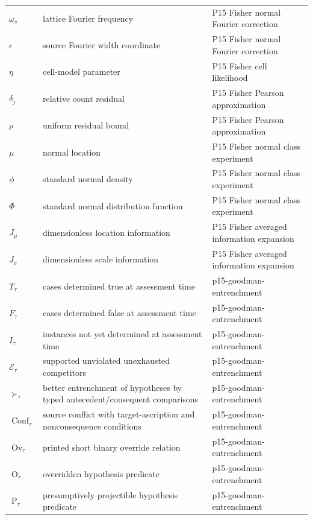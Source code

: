 \begin{longtable}{@{}p{}p{}p{}@{}}
\(\omega_s\) & lattice Fourier frequency & P15 Fisher normal Fourier correction \\
\(\epsilon\) & source Fourier width coordinate & P15 Fisher normal Fourier correction \\
\(\eta\) & cell-model parameter & P15 Fisher cell likelihood \\
\(\delta_j\) & relative count residual & P15 Fisher Pearson approximation \\
\(\rho\) & uniform residual bound & P15 Fisher Pearson approximation \\
\(\mu\) & normal location & P15 Fisher normal class experiment \\
\(\phi\) & standard normal density & P15 Fisher normal class experiment \\
\(\Phi\) & standard normal distribution function & P15 Fisher normal class experiment \\
\(J_\mu\) & dimensionless location information & P15 Fisher averaged information expansion \\
\(J_\sigma\) & dimensionless scale information & P15 Fisher averaged information expansion \\
\(T_\tau\) & cases determined true at assessment time & p15-\allowbreak{}goodman-\allowbreak{}entrenchment \\
\(F_\tau\) & cases determined false at assessment time & p15-\allowbreak{}goodman-\allowbreak{}entrenchment \\
\(I_\tau\) & instances not yet determined at assessment time & p15-\allowbreak{}goodman-\allowbreak{}entrenchment \\
\(\mathcal E_\tau\) & supported unviolated unexhausted competitors & p15-\allowbreak{}goodman-\allowbreak{}entrenchment \\
\(\succ_\tau\) & better entrenchment of hypotheses by typed antecedent/consequent comparisons & p15-\allowbreak{}goodman-\allowbreak{}entrenchment \\
\(\operatorname{Conf}_\tau\) & source conflict with target-ascription and nonconsequence conditions & p15-\allowbreak{}goodman-\allowbreak{}entrenchment \\
\(\operatorname{Ov}_\tau\) & printed short binary override relation & p15-\allowbreak{}goodman-\allowbreak{}entrenchment \\
\(\operatorname{O}_\tau\) & overridden hypothesis predicate & p15-\allowbreak{}goodman-\allowbreak{}entrenchment \\
\(\operatorname{P}_\tau\) & presumptively projectible hypothesis predicate & p15-\allowbreak{}goodman-\allowbreak{}entrenchment \\

\end{longtable}
